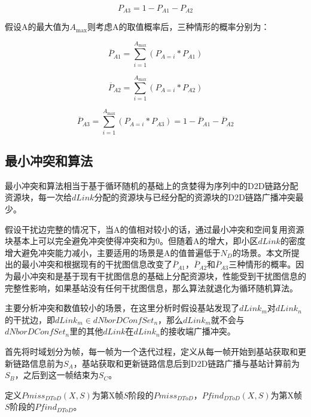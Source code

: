 \documentclass[figurelist,tablelist,algorithmlist,nomlist,masters]{seuthesix}
\begin{document}
	\begin{equation}\label{eq3.1}
	P_{A3} = 1 - P_{A1} - P_{A2}
	\end{equation}
	
	假设A的最大值为${A_{\max }}$则考虑A的取值概率后，三种情形的概率分别为：
	
	\begin{equation}\label{eq3.1}
	{\overline P_{A1}} = \sum\limits_{i = 1}^{{A_{\max }}} {({P_{A = i}}*P_{A1})}
	\end{equation}
	
	\begin{equation}\label{eq3.1}
	{\overline P_{A2}} = \sum\limits_{i = 1}^{{A_{\max }}} {({P_{A = i}}*{P_{A2}})}
	\end{equation}
	
	\begin{equation}\label{eq3.1}
	{\overline P_{A3}} = \sum\limits_{i = 1}^{{A_{\max }}} {({P_{A = i}}*{P_{A3}}) = } 1 - {\overline P_{A1}} - {\overline P_{A2}}
	\end{equation}
	
	\subsection{最小冲突和算法}
	最小冲突和算法相当于基于循环随机的基础上的贪婪得为序列中的D2D链路分配资源块，每一次给$dLink$分配的资源块与已经分配的资源块的D2D链路广播冲突最少。
	
	假设干扰边完整的情况下，当A的值相对较小的话，通过最小冲突和空间复用资源块基本上可以完全避免冲突使得冲突和为0。但随着A的增大，即小区$dLink$的密度增大避免冲突能力减小，主要适用的场景是A的值普遍低于$N_D$的场景。本文所提出的最小冲突和根据现有的干扰图信息改变了${\overline P_{A1}}$，${\overline P_{A2}}$和${\overline P_{A3}}$三种情形的概率。因为最小冲突和是基于现有干扰图信息的基础上分配资源块，性能受到干扰图信息的完整性影响，如果基站没有任何干扰图信息，那么算法就退化为循环随机算法。
	
	主要分析冲突和数值较小的场景，在这里分析时假设基站发现了$dLink_m$对$dLink_n$的干扰边，即$dLink_m \in dNborDConfSe{t_n}$，那么$dLink_m$就不会与$dNborDConfSe{t_n}$里的其他$dLink$在$dLink_n$的接收端广播冲突。
	
	首先将时域划分为帧，每一帧为一个迭代过程，定义从每一帧开始到基站获取和更新链路信息前为$S{_A}$，基站获取和更新链路信息后到D2D链路广播与基站计算前为$S{_B}$，之后到这一帧结束为$S{_C}$。
	
	定义$Pmis{s_{DToD}}(X,S)$为第X帧$S$阶段的$Pmis{s_{DToD}}$，$Pfin{d_{DToD}}(X,S)$为第X帧$S$阶段的$Pfin{d_{DToD}}$。
	
\end{document}
